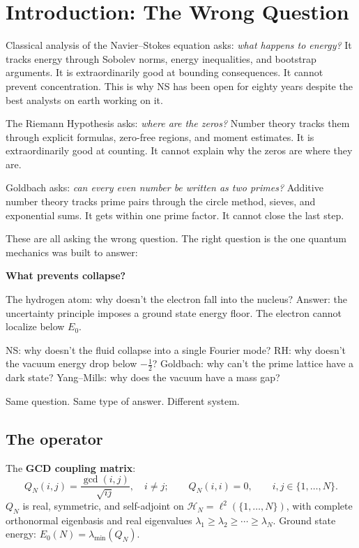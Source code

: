 \documentclass[12pt]{article}
\newcommand{\half}{\tfrac{1}{2}}
\begin{document}
\tableofcontents
\newpage

\section{Introduction: The Wrong Question}
\label{sec:intro}

Classical analysis of the Navier--Stokes equation asks:
\emph{what happens to energy?}
It tracks energy through Sobolev norms, energy inequalities, and
bootstrap arguments.
It is extraordinarily good at bounding consequences.
It cannot prevent concentration.
This is why NS has been open for eighty years despite the best
analysts on earth working on it.

The Riemann Hypothesis asks: \emph{where are the zeros?}
Number theory tracks them through explicit formulas, zero-free regions,
and moment estimates.
It is extraordinarily good at counting.
It cannot explain why the zeros are where they are.

Goldbach asks: \emph{can every even number be written as two primes?}
Additive number theory tracks prime pairs through the circle method,
sieves, and exponential sums.
It gets within one prime factor.
It cannot close the last step.

These are all asking the wrong question.
The right question is the one quantum mechanics was built to answer:

\begin{center}
\textbf{\large What prevents collapse?}
\end{center}

The hydrogen atom: why doesn't the electron fall into the nucleus?
Answer: the uncertainty principle imposes a ground state energy floor.
The electron cannot localize below $E_0$.

NS: why doesn't the fluid collapse into a single Fourier mode?
RH: why doesn't the vacuum energy drop below $-\half$?
Goldbach: why can't the prime lattice have a dark state?
Yang--Mills: why does the vacuum have a mass gap?

Same question. Same type of answer. Different system.

\subsection{The operator}

The \textbf{GCD coupling matrix}:
\[
  Q_N(i,j) = \frac{\gcd(i,j)}{\sqrt{ij}}, \quad i\ne j;\qquad
  Q_N(i,i) = 0,\qquad i,j \in \{1,\ldots,N\}.
\]
$Q_N$ is real, symmetric, and self-adjoint on
$\mathcal{H}_N = \ell^2(\{1,\ldots,N\})$,
with complete orthonormal eigenbasis and real eigenvalues
$\lambda_1 \ge \lambda_2 \ge \cdots \ge \lambda_N$.
Ground state energy: $E_0(N) = \lambda_{\min}(Q_N)$.
\end{document}
